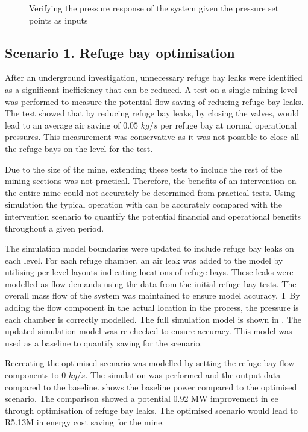 	\begin{figure}[h!]
		\centering
		
		\caption{Verifying the pressure response of the system given the pressure set points as inputs}
		\label{fig: Verification Pressure kusasalethu Setpoint}
	\end{figure}
	\subsection{Scenario 1. Refuge bay optimisation}
	After an underground investigation, unnecessary refuge bay leaks were identified as a significant inefficiency that can be reduced. A test on a single mining level was performed to measure the potential flow saving of reducing refuge bay leaks. The test showed that by reducing refuge bay leaks, by closing the valves, would lead to an average air saving of $0.05$ $kg/s$ per refuge bay at normal operational pressures. This measurement was conservative as it was not possible to close all the refuge bays on the level for the test. 
	\par 
	Due to the size of the mine, extending these tests to include the rest of the mining sections was not practical.  Therefore,  the benefits of an intervention on the entire mine could not accurately be determined from practical tests. Using simulation the typical operation with can be accurately compared with the intervention scenario to quantify the potential financial and operational benefits throughout a given period.
	\par
	The simulation model boundaries were updated to include refuge bay leaks on each level. For each refuge chamber, an air leak was added to the model by utilising per level layouts indicating locations of refuge bays. These leaks were modelled as flow demands using the data from the initial refuge bay tests. The overall mass flow of the system was maintained to ensure model accuracy. T By adding the flow component in the actual location in the process, the pressure is each chamber is correctly modelled. The full simulation model is shown in . The updated simulation model was re-checked to ensure accuracy. This model was used as a baseline to quantify saving for the scenario.
	\par 
	Recreating the optimised scenario was modelled by setting the refuge bay flow components to 0 $kg/s$. The simulation was performed and the output data compared to the baseline.  shows the baseline power compared to the optimised scenario. The comparison showed a potential 0.92 MW improvement in \gls{ee} through optimisation of refuge bay leaks. The optimised scenario would lead to R5.13M in energy cost saving for the mine.
